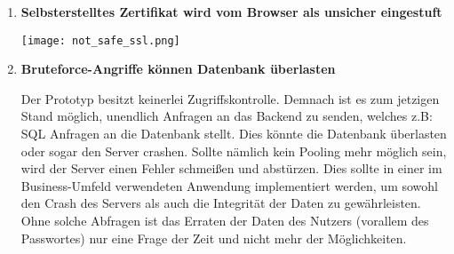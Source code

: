 \begin{enumerate}
\item \textbf{Selbsterstelltes Zertifikat wird vom Browser als unsicher eingestuft}

\begin{center}
    \center
    \texttt{[image: not\_safe\_ssl.png]}
\end{center}

\item \textbf{Bruteforce-Angriffe können Datenbank überlasten}

Der Prototyp besitzt keinerlei Zugriffskontrolle. Demnach ist es zum jetzigen Stand möglich, unendlich Anfragen an das Backend zu senden, welches z.B: SQL Anfragen an die Datenbank stellt. Dies könnte die Datenbank überlasten oder sogar den Server crashen. Sollte nämlich kein Pooling mehr möglich sein, wird der Server einen Fehler schmeißen und abstürzen. Dies sollte in einer im Business-Umfeld verwendeten Anwendung implementiert werden, um sowohl den Crash des Servers als auch die Integrität der Daten zu gewährleisten. Ohne solche Abfragen ist das Erraten der Daten des Nutzers (vorallem des Passwortes) nur eine Frage der Zeit und nicht mehr der Möglichkeiten.

\end{enumerate}

